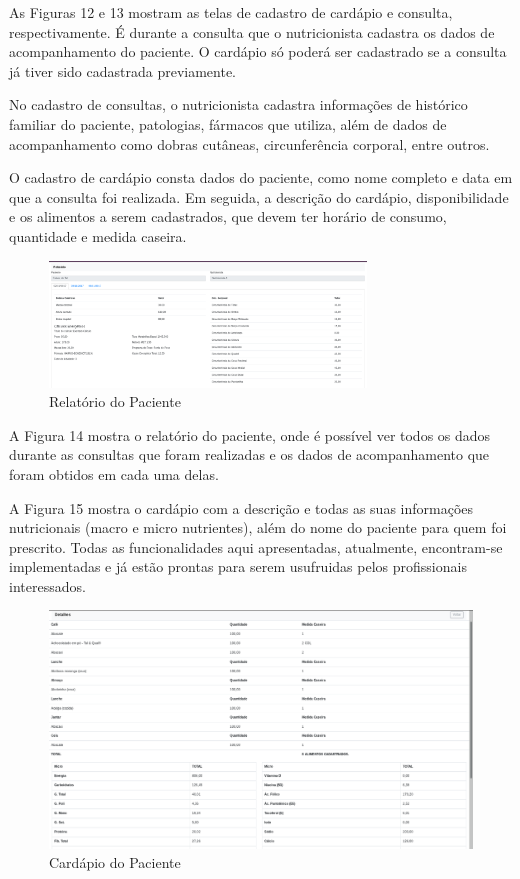 \documentclass[
	12pt,				%
    oneside,			%
	a4paper,			%
	english,			%
	french,				%
	spanish,			%
	brazil,				%
	]{abntex2}
\begin{document}
As Figuras 12 e 13 mostram as telas de cadastro de cardápio e consulta,
respectivamente. É durante a consulta que o nutricionista cadastra os dados de
acompanhamento do paciente. O cardápio só poderá ser cadastrado se a consulta já
tiver sido cadastrada previamente.

No cadastro de consultas, o nutricionista cadastra informações de histórico
familiar do paciente, patologias, fármacos que utiliza, além de dados de
acompanhamento como dobras cutâneas, circunferência corporal, entre outros.

O cadastro de cardápio consta dados do paciente, como nome completo e data
em que a consulta foi realizada. Em seguida, a descrição do cardápio, disponibilidade
e os alimentos a serem cadastrados, que devem ter horário de consumo, quantidade
e medida caseira.

\begin{figure} [hbt]
\label{relatPac} 
\caption{Relatório do Paciente}
\begin{center}
\includegraphics[width=0.75\textwidth]{relatPac1.png}
\end{center}
\end{figure}

A Figura 14 mostra o relatório do paciente, onde é possível ver todos os dados
durante as consultas que foram realizadas e os dados de acompanhamento que foram
obtidos em cada uma delas.

A Figura 15 mostra o cardápio com a descrição e todas as suas informações
nutricionais (macro e micro nutrientes), além do nome do paciente para quem foi
prescrito.
Todas as funcionalidades aqui apresentadas, atualmente, encontram-se
implementadas e já estão prontas para serem usufruidas pelos profissionais interessados.

\begin{figure} [hbt]
\begin{center}
\includegraphics[width=1.0\textwidth]{cardPac1.png}
\end{center}
\label{cardPac} 
\caption{Cardápio do Paciente}
\end{figure}
\end{document}
